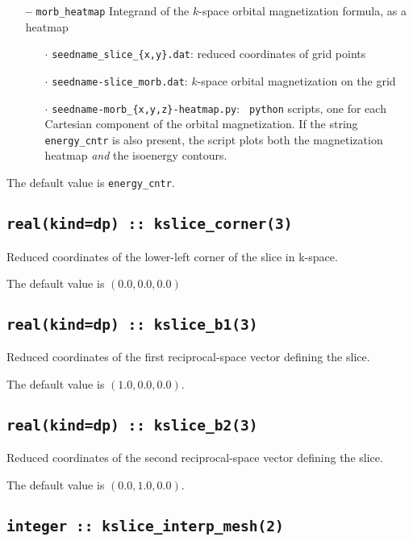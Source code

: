 \begin{itemize}
\item[{\bf --}] \verb#morb_heatmap# Integrand of the $k$-space orbital
  magnetization formula, as a heatmap

  \begin{itemize}

  \item[$\cdot$] {\tt seedname\_slice\_\{x,y\}.dat}: reduced coordinates
    of grid points 
    
  \item[$\cdot$] {\tt seedname-slice\_morb.dat}: $k$-space orbital
    magnetization on the grid
    
  \item[$\cdot$] {\tt seedname-morb\_\{x,y,z\}-heatmap.py}: {\tt
      python} scripts, one for each Cartesian component of the orbital
    magnetization. If the string {\tt energy\_cntr} is also present,
    the script plots both the magnetization heatmap {\it and} the
    isoenergy contours.
    
  \end{itemize}

\end{itemize}

The default value is {\tt energy\_cntr}.

\subsection[kslice\_corner]{\tt real(kind=dp) :: kslice\_corner(3)}
Reduced coordinates of the lower-left corner of the slice in k-space.

The default value is $(0.0,0.0,0.0)$

\subsection[kslice\_corner]{\tt real(kind=dp) :: kslice\_b1(3)}
Reduced coordinates of the first reciprocal-space vector 
defining the slice.

The default value is $(1.0,0.0,0.0)$.

\subsection[kslice\_corner]{\tt real(kind=dp) :: kslice\_b2(3)}
Reduced coordinates of the second reciprocal-space vector 
defining the slice.

The default value is $(0.0,1.0,0.0)$.

\subsection[kslice\_num\_points]{\tt integer :: kslice\_interp\_mesh(2)}

